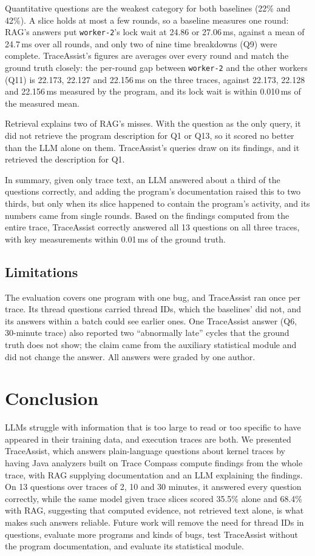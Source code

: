 \documentclass[10pt,conference]{IEEEtran}
\newcommand{\sysname}{TraceAssist\xspace}
\begin{document}
Quantitative questions are the weakest category for both baselines (22\% and 42\%). A slice holds at most a few rounds, so a baseline measures one round: RAG's answers put \texttt{worker-2}'s lock wait at 24.86 or 27.06\,ms, against a mean of 24.7\,ms over all rounds, and only two of nine time breakdowns (Q9) were complete. \sysname's figures are averages over every round and match the ground truth closely: the per-round gap between \texttt{worker-2} and the other workers (Q11) is 22.173, 22.127 and 22.156\,ms on the three traces, against 22.173, 22.128 and 22.156\,ms measured by the program, and its lock wait is within 0.010\,ms of the measured mean.

Retrieval explains two of RAG's misses. With the question as the only query, it did not retrieve the program description for Q1 or Q13, so it scored no better than the LLM alone on them. \sysname's queries draw on its findings, and it retrieved the description for Q1.

In summary, given only trace text, an LLM answered about a third of the questions correctly, and adding the program's documentation raised this to two thirds, but only when its slice happened to contain the program's activity, and its numbers came from single rounds. Based on the findings computed from the entire trace, \sysname correctly answered all 13 questions  on all three traces, with key measurements within 0.01\,ms of the ground truth.

\subsection{Limitations}

The evaluation covers one program with one bug, and \sysname ran once per trace. Its thread questions carried thread IDs, which the baselines' did not, and its answers within a batch could see earlier ones. One \sysname answer (Q6, 30-minute trace) also reported two ``abnormally late'' cycles that the ground truth does not show; the claim came from the auxiliary statistical module and did not change the answer. All answers were graded by one author.


\section{Conclusion}
LLMs struggle with information that is too large to read or too specific to have appeared in their training data, and execution traces are both. We presented \sysname, which answers plain-language questions about kernel traces by having Java analyzers built on Trace Compass compute findings from the whole trace, with RAG supplying documentation and an LLM explaining the findings. On 13 questions over traces of 2, 10 and 30 minutes, it answered every question correctly, while the same model given trace slices scored 35.5\% alone and 68.4\% with RAG, suggesting that computed evidence, not retrieved text alone, is what makes such answers reliable. Future work will remove the need for thread IDs in questions, evaluate more programs and kinds of bugs, test \sysname without the program documentation, and evaluate its statistical module.
\end{document}
